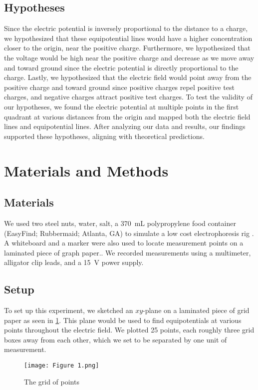 \documentclass[10pt,journal,twoside]{IEEEtran}
\begin{document}
\subsection{Hypotheses}
Since the electric potential is inversely proportional to the distance to a charge, we hypothesized that these equipotential lines would have a higher concentration closer to the origin, near the positive charge. Furthermore, we hypothesized that the voltage would be high near the positive charge and decrease as we move away and toward ground since the electric potential is directly proportional to the charge. Lastly, we hypothesized that the electric field would point away from the positive charge and toward ground since positive charges repel positive test charges, and negative charges attract positive test charges. To test the validity of our hypotheses, we found the electric potential at multiple points in the first quadrant at various distances from the origin and mapped both the electric field lines and equipotential lines. After analyzing our data and results, our findings supported these hypotheses, aligning with theoretical predictions.





\section{Materials and Methods}
\subsection{Materials}
We used two steel nuts, water, salt, a \qty{370}{\milli\liter} polypropylene food container (EasyFind; Rubbermaid; Atlanta, GA) to simulate a low cost electrophoresis rig \cite{campbell}. A whiteboard and a marker were also used to locate measurement points on a laminated piece of graph paper.. We recorded measurements using a multimeter, alligator clip leads, and a \qty{15}{\volt} power supply.  

\subsection{Setup}
To set up this experiment, we sketched an $xy$-plane on a laminated piece of grid paper as seen in \cref{fig:1}. This plane would be used to find equipotentials at various points throughout the electric field. We plotted 25 points, each roughly three grid boxes away from each other, which we set to be separated by one unit of measurement.
\begin{figure}
\begin{center}
\texttt{[image: Figure 1.png]}
\end{center}
\caption{The grid of points}
\label{fig:1}    
\end{figure}
\end{document}
